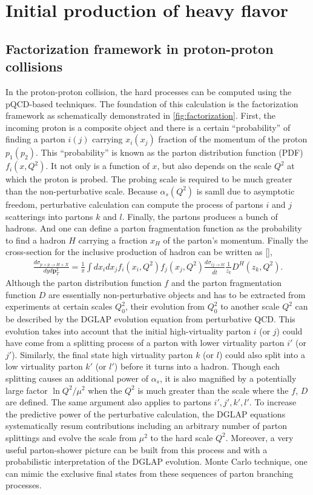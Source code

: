 \section{Initial production of heavy flavor}
\subsection{Factorization framework in proton-proton collisions}
In the proton-proton collision, the hard processes can be computed using the pQCD-based techniques.
The foundation of this calculation is the factorization framework as schematically demonstrated in \ref{fig:factorization}.
First, the incoming proton is a composite object and there is a certain ``probability'' of finding a parton $i(j)$ carrying $x_i(x_j)$ fraction of the momentum of the proton $p_1(p_2)$.
This ``probability'' is known as the parton distribution function (PDF) $f_i(x, Q^2)$.
It not only is a function of $x$, but also depends on the scale $Q^2$ at which the proton is probed.
The probing scale is required to be much greater than the non-perturbative scale.
Because $\alpha_s(Q^2)$ is samll due to asymptotic freedom, perturbative calculation can compute the process of partons $i$ and $j$ scatterings into partons $k$ and $l$.
Finally, the partons produces a bunch of hadrons. 
And one can define a parton fragmentation function as the probability to find a hadron $H$ carrying a fraction $x_H$ of the parton's momentum.
Finally the cross-section for the inclusive production of hadron can be written as [],
\begin{eqnarray}
\frac{d\sigma_{p+p\rightarrow H+X}}{dy d\mathbf{p}_T^2} = \frac{1}{\pi}\int dx_i dx_j f_i(x_i, Q^2) f_j(x_j, Q^2) \frac{d\sigma_{ij\rightarrow kl}}{d\hat{t}} \frac{1}{z_k}D^H(z_k, Q^2).
\end{eqnarray}
Although the parton distribution function $f$ and the parton fragmentation function $D$ are essentially non-perturbative objects and has to be extracted from experiments at certain scales $Q_0^2$, their evolution from $Q_0^2$ to another scale $Q^2$ can be described by the DGLAP evolution equation from perturbative QCD.
This evolution takes into account that the initial high-virtuality parton $i$ (or $j$) could have come from a splitting process of a parton with lower virtuality parton $i'$ (or $j'$).
Similarly, the final state high virtuality parton $k$ (or $l$) could also split into a low virtuality parton $k'$ (or $l'$) before it turns into a hadron.
Though each splitting causes an additional power of $\alpha_s$, it is also magnified by a potentially large factor $\ln Q^2/\mu^2$ when the $Q^2$ is much greater than the scale where the $f$, $D$ are defined.
The same argument also applies to partons $i', j', k', l'$. 
To increase the predictive power of the perturbative calculation, 
the DGLAP equations systematically resum contributions including an arbitrary number of parton splittings and evolve the scale from $\mu^2$ to the hard scale $Q^2$.
Moreover, a very useful parton-shower picture can be built from this process and with a probabilistic interpretation of the DGLAP evolution. Monte Carlo technique, one can mimic the exclusive final states from these sequences of parton branching processes.

